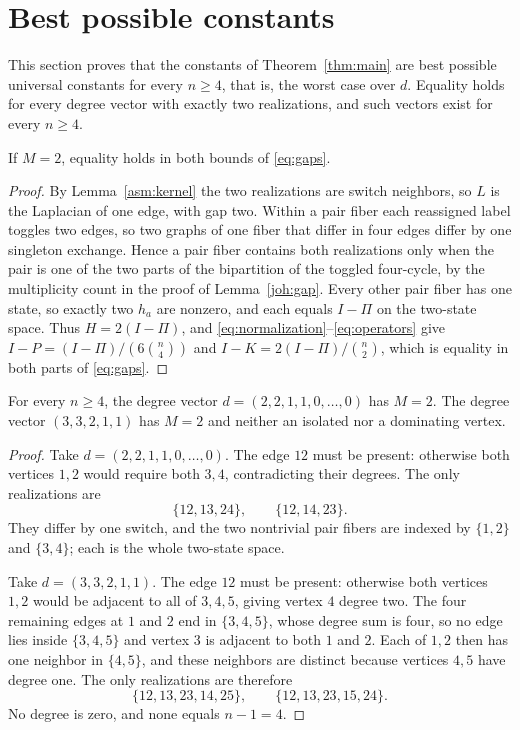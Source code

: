 \section{Best possible constants}\label{shp:section}
This section proves that the constants of Theorem~\ref{thm:main} are best
possible universal constants for every $n\ge4$, that is, the worst case over
$d$. Equality holds for every degree vector with exactly two realizations,
and such vectors exist for every $n\ge4$.

\begin{proposition}\label{shp:two}
If $M=2$, equality holds in both bounds of \eqref{eq:gaps}.
\end{proposition}
\begin{proof}
By Lemma~\ref{asm:kernel} the two realizations are switch neighbors, so $L$
is the Laplacian of one edge, with gap two. Within a pair fiber each
reassigned label toggles two edges, so two graphs of one fiber that differ in
four edges differ by one singleton exchange. Hence a pair fiber contains both
realizations only when the pair is one of the two parts of the bipartition of
the toggled four-cycle, by the multiplicity count in the proof of
Lemma~\ref{joh:gap}. Every other pair fiber has one state, so exactly two
$h_a$ are nonzero, and each equals $I-\Pi$ on the two-state space. Thus
$H=2(I-\Pi)$, and \eqref{eq:normalization}--\eqref{eq:operators} give
$I-P=(I-\Pi)/(6\binom n4)$ and $I-K=2(I-\Pi)/\binom n2$, which is equality in
both parts of \eqref{eq:gaps}.
\end{proof}

\begin{proposition}\label{shp:extremal}
For every $n\ge4$, the degree vector $d=(2,2,1,1,0,\ldots,0)$ has $M=2$. The
degree vector $(3,3,2,1,1)$ has $M=2$ and neither an isolated nor a
dominating vertex.
\end{proposition}
\begin{proof}
Take $d=(2,2,1,1,0,\ldots,0)$. The edge $12$ must be present: otherwise both
vertices $1,2$ would require both $3,4$, contradicting their degrees. The only
realizations are
\[
 \{12,13,24\},\qquad \{12,14,23\}.
\]
They differ by one switch, and the two nontrivial pair fibers are indexed by
$\{1,2\}$ and $\{3,4\}$; each is the whole two-state space.

Take $d=(3,3,2,1,1)$. The edge $12$ must be present: otherwise both vertices
$1,2$ would be adjacent to all of $3,4,5$, giving vertex $4$ degree two. The
four remaining edges at $1$ and $2$ end in $\{3,4,5\}$, whose degree sum is
four, so no edge lies inside $\{3,4,5\}$ and vertex $3$ is adjacent to both
$1$ and $2$. Each of $1,2$ then has one neighbor in $\{4,5\}$, and these
neighbors are distinct because vertices $4,5$ have degree one. The only
realizations are therefore
\[
 \{12,13,23,14,25\},\qquad \{12,13,23,15,24\}.
\]
No degree is zero, and none equals $n-1=4$.
\end{proof}

